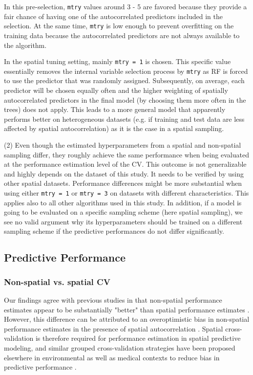 \documentclass[review]{elsarticle}
\begin{document}
In this pre-selection, \texttt{mtry} values around 3 - 5 are favored because they provide a fair chance of having one of the autocorrelated predictors included in the selection.
At the same time, \texttt{mtry} is low enough to prevent overfitting on the training data because the autocorrelated predictors are not always available to the algorithm.

In the spatial tuning setting, mainly \texttt{mtry = 1} is chosen.
This specific value essentially removes the internal variable selection process by \texttt{mtry} as RF is forced to use the predictor that was randomly assigned.
Subsequently, on average, each predictor will be chosen equally often and the higher weighting of spatially autocorrelated predictors in the final model (by choosing them more often in the trees) does not apply.
This leads to a more general model that apparently performs better on heterogeneous datasets (e.g. if training and test data are less affected by spatial autocorrelation) as it is the case in a spatial sampling.

(2) Even though the estimated hyperparameters from a spatial and non-spatial sampling differ, they roughly achieve the same performance when being evaluated at the performance estimation level of the CV. 
This outcome is not generalizable and highly depends on the dataset of this study. 
It needs to be verified by using other spatial datasets.
Performance differences might be more substantial when using either \texttt{mtry = 1} or \texttt{mtry = 3} on datasets with different characteristics.
This applies also to all other algorithms used in this study.
In addition, if a model is going to be evaluated on a specific sampling scheme (here spatial sampling), we see no valid argument why its hyperparameters should be trained on a different sampling scheme if the predictive performances do not differ significantly.

\subsection{Predictive Performance}

\subsubsection{Non-spatial vs. spatial CV}
Our findings agree with previous studies in that non-spatial performance estimates appear to be substantially "better" than spatial performance estimates \citep{Meyer2018, Micheletti2013, Roberts2017}.
However, this difference can be attributed to an overoptimistic bias in non-spatial performance estimates in the presence of spatial autocorrelation \citep{Goetz2015, Meyer2018, Russ2010a, Steger2016}.
Spatial cross-validation is therefore required for performance estimation in spatial predictive modeling, and similar grouped cross-validation strategies have been proposed elsewhere in environmental as well as medical contexts to reduce bias in predictive performance \citep{Brenning2008, Meyer2018, Pena2015, Pohjankukka2017, Roberts2017}. 
\end{document}

